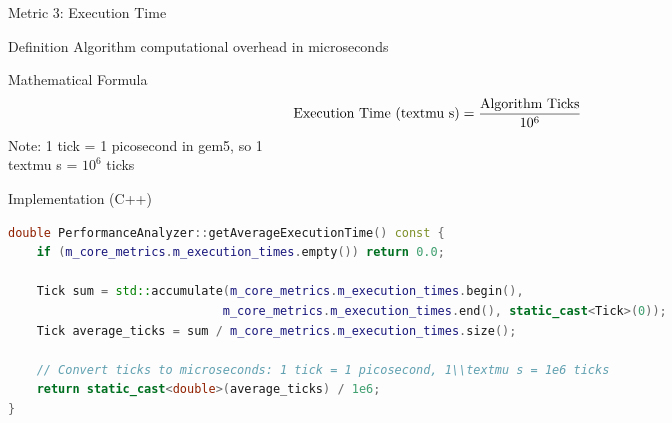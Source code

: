 \documentclass[10pt,aspectratio=169]{beamer}
\begin{document}
\begin{frame}[fragile]{Metric 3: Execution Time}
    \begin{block}{Definition}
        Algorithm computational overhead in microseconds
    \end{block}
    
    \begin{block}{Mathematical Formula}
        \begin{equation}
            \text{Execution Time (\\textmu s)} = \frac{\text{Algorithm Ticks}}{10^6}
        \end{equation}
        \small{Note: 1 tick = 1 picosecond in gem5, so 1\\textmu s = $10^6$ ticks}
    \end{block}
    
    \begin{block}{Implementation (C++)}
        \begin{lstlisting}[language=C++, basicstyle=\tiny\ttfamily]
double PerformanceAnalyzer::getAverageExecutionTime() const {
    if (m_core_metrics.m_execution_times.empty()) return 0.0;
    
    Tick sum = std::accumulate(m_core_metrics.m_execution_times.begin(), 
                              m_core_metrics.m_execution_times.end(), static_cast<Tick>(0));
    Tick average_ticks = sum / m_core_metrics.m_execution_times.size();
    
    // Convert ticks to microseconds: 1 tick = 1 picosecond, 1\\textmu s = 1e6 ticks
    return static_cast<double>(average_ticks) / 1e6;
}
        \end{lstlisting}
    \end{block}
\end{frame}
\end{document}
